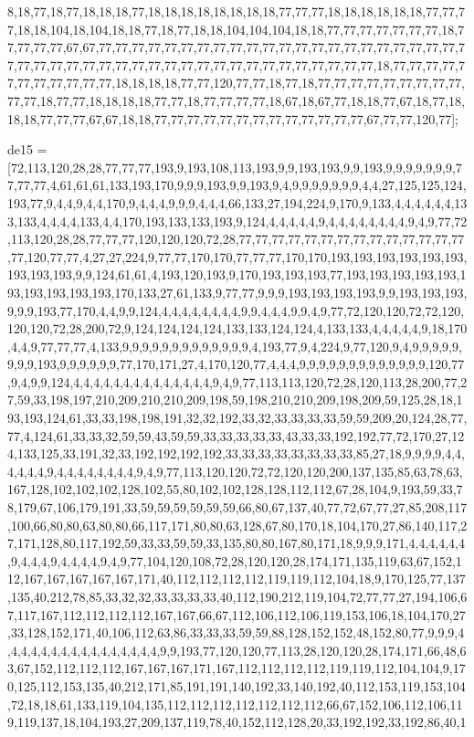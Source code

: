 8,18,77,18,77,18,18,18,77,18,18,18,18,18,18,18,18,77,77,77,18,18,18,18,18,18,77,77,77,18,18,104,18,104,18,18,77,18,77,18,18,104,104,104,18,18,77,77,77,77,77,77,77,18,77,77,77,77,67,67,77,77,77,77,77,77,77,77,77,77,77,77,77,77,77,77,77,77,77,77,77,77,77,77,77,77,77,77,77,77,77,77,77,77,77,77,77,77,77,77,77,77,77,77,77,18,77,77,77,77,77,77,77,77,77,77,77,18,18,18,18,77,77,120,77,77,18,77,18,77,77,77,77,77,77,77,77,77,77,77,18,77,77,18,18,18,18,77,77,18,77,77,77,77,18,67,18,67,77,18,18,77,67,18,77,18,18,18,77,77,77,67,67,18,18,77,77,77,77,77,77,77,77,77,77,77,77,77,67,77,77,120,77];

de15 = [72,113,120,28,28,77,77,77,193,9,193,108,113,193,9,9,193,193,9,9,193,9,9,9,9,9,9,9,77,77,77,4,61,61,61,133,193,170,9,9,9,193,9,9,193,9,4,9,9,9,9,9,9,9,4,4,27,125,125,124,193,77,9,4,4,9,4,4,170,9,4,4,4,9,9,9,4,4,4,66,133,27,194,224,9,170,9,133,4,4,4,4,4,4,133,133,4,4,4,4,133,4,4,170,193,133,133,193,9,124,4,4,4,4,4,9,4,4,4,4,4,4,4,4,9,4,9,77,72,113,120,28,28,77,77,77,120,120,120,72,28,77,77,77,77,77,77,77,77,77,77,77,77,77,77,77,120,77,77,4,27,27,224,9,77,77,170,170,77,77,77,170,170,193,193,193,193,193,193,193,193,193,9,9,124,61,61,4,193,120,193,9,170,193,193,193,77,193,193,193,193,193,193,193,193,193,193,170,133,27,61,133,9,77,77,9,9,9,193,193,193,193,9,9,193,193,193,9,9,9,193,77,170,4,4,9,9,124,4,4,4,4,4,4,4,4,9,9,4,4,4,9,9,4,9,77,72,120,120,72,72,120,120,120,72,28,200,72,9,124,124,124,124,133,133,124,124,4,133,133,4,4,4,4,4,9,18,170,4,4,9,77,77,77,4,133,9,9,9,9,9,9,9,9,9,9,9,9,9,4,193,77,9,4,224,9,77,120,9,4,9,9,9,9,9,9,9,9,193,9,9,9,9,9,9,77,170,171,27,4,170,120,77,4,4,4,9,9,9,9,9,9,9,9,9,9,9,9,9,120,77,9,4,9,9,124,4,4,4,4,4,4,4,4,4,4,4,4,4,4,9,4,9,77,113,113,120,72,28,120,113,28,200,77,27,59,33,198,197,210,209,210,210,209,198,59,198,210,210,209,198,209,59,125,28,18,193,193,124,61,33,33,198,198,191,32,32,192,33,32,33,33,33,33,59,59,209,20,124,28,77,77,4,124,61,33,33,32,59,59,43,59,59,33,33,33,33,33,43,33,33,192,192,77,72,170,27,124,133,125,33,191,32,33,192,192,192,192,33,33,33,33,33,33,33,33,85,27,18,9,9,9,9,4,4,4,4,4,4,9,4,4,4,4,4,4,4,4,9,4,9,77,113,120,120,72,72,120,120,200,137,135,85,63,78,63,167,128,102,102,102,128,102,55,80,102,102,128,128,112,112,67,28,104,9,193,59,33,78,179,67,106,179,191,33,59,59,59,59,59,59,66,80,67,137,40,77,72,67,77,27,85,208,117,100,66,80,80,63,80,80,66,117,171,80,80,63,128,67,80,170,18,104,170,27,86,140,117,27,171,128,80,117,192,59,33,33,59,59,33,135,80,80,167,80,171,18,9,9,9,171,4,4,4,4,4,4,9,4,4,4,9,4,4,4,4,9,4,9,77,104,120,108,72,28,120,120,28,174,171,135,119,63,67,152,112,167,167,167,167,167,171,40,112,112,112,112,119,119,112,104,18,9,170,125,77,137,135,40,212,78,85,33,32,32,33,33,33,33,40,112,190,212,119,104,72,77,77,27,194,106,67,117,167,112,112,112,112,167,167,66,67,112,106,112,106,119,153,106,18,104,170,27,33,128,152,171,40,106,112,63,86,33,33,33,59,59,88,128,152,152,48,152,80,77,9,9,9,4,4,4,4,4,4,4,4,4,4,4,4,4,4,4,4,9,9,193,77,120,120,77,113,28,120,120,28,174,171,66,48,63,67,152,112,112,112,167,167,167,171,167,112,112,112,112,119,119,112,104,104,9,170,125,112,153,135,40,212,171,85,191,191,140,192,33,140,192,40,112,153,119,153,104,72,18,18,61,133,119,104,135,112,112,112,112,112,112,112,66,67,152,106,112,106,119,119,137,18,104,193,27,209,137,119,78,40,152,112,128,20,33,192,192,33,192,86,40,1